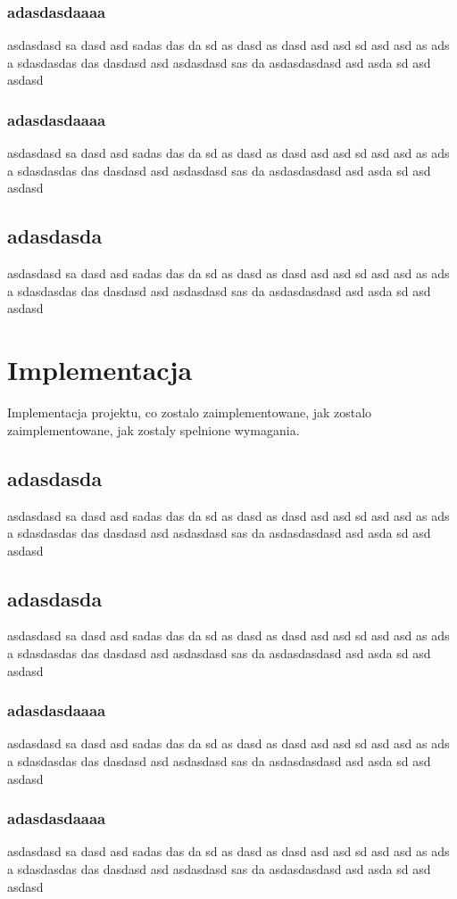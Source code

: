 \documentclass[14pt]{article}
\begin{document}
\subsubsection{adasdasdaaaa}
asdasdasd sa dasd asd sadas das da sd as dasd as dasd asd asd sd asd asd as ads a sdasdasdas das dasdasd asd asdasdasd sas da asdasdasdasd asd asda sd asd asdasd

\subsubsection{adasdasdaaaa}
asdasdasd sa dasd asd sadas das da sd as dasd as dasd asd asd sd asd asd as ads a sdasdasdas das dasdasd asd asdasdasd sas da asdasdasdasd asd asda sd asd asdasd

\subsection{adasdasda}
asdasdasd sa dasd asd sadas das da sd as dasd as dasd asd asd sd asd asd as ads a sdasdasdas das dasdasd asd asdasdasd sas da asdasdasdasd asd asda sd asd asdasd

\section{Implementacja}

Implementacja projektu, co zostalo zaimplementowane, jak zostalo zaimplementowane, jak zostaly spelnione wymagania.

\subsection{adasdasda}
asdasdasd sa dasd asd sadas das da sd as dasd as dasd asd asd sd asd asd as ads a sdasdasdas das dasdasd asd asdasdasd sas da asdasdasdasd asd asda sd asd asdasd

\subsection{adasdasda}
asdasdasd sa dasd asd sadas das da sd as dasd as dasd asd asd sd asd asd as ads a sdasdasdas das dasdasd asd asdasdasd sas da asdasdasdasd asd asda sd asd asdasd

\subsubsection{adasdasdaaaa}
asdasdasd sa dasd asd sadas das da sd as dasd as dasd asd asd sd asd asd as ads a sdasdasdas das dasdasd asd asdasdasd sas da asdasdasdasd asd asda sd asd asdasd

\subsubsection{adasdasdaaaa}
asdasdasd sa dasd asd sadas das da sd as dasd as dasd asd asd sd asd asd as ads a sdasdasdas das dasdasd asd asdasdasd sas da asdasdasdasd asd asda sd asd asdasd
\end{document}
